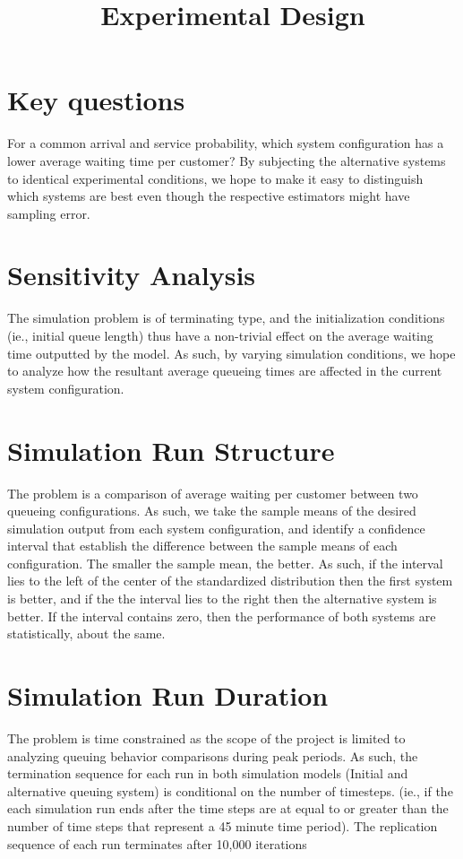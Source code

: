 \documentclass{article}
\begin{document}
\pagecolor{ultramarine}
\title{Experimental Design}
\author{}
\date{}
\maketitle
\section{Key questions}
For a common arrival and service probability, which system configuration has a lower average waiting time per customer? By subjecting the alternative systems to identical experimental conditions, we hope to make it easy to distinguish which systems are best even though the respective estimators might have sampling error.

\section{Sensitivity Analysis}
The simulation problem is of terminating type, and the initialization conditions (ie., initial queue length) thus have a non-trivial effect on the average waiting time outputted by the model. As such, by varying simulation conditions, we hope to analyze how the resultant average queueing times are affected in the current system configuration.

\section{Simulation Run Structure}
The problem is a comparison of average waiting per customer between two queueing configurations. As such, we take the sample means of the desired simulation output from each system configuration, and identify a confidence interval that establish the difference between the sample means of each configuration. The smaller the sample mean, the better. As such, if the interval lies to the left of the center of the standardized distribution then the first system is better, and if the the interval lies to the right then the alternative system is better. If the interval contains zero, then the performance of both systems are statistically, about the same. 

\section{Simulation Run Duration}
The problem is time constrained as the scope of the project is limited to analyzing queuing behavior comparisons during peak periods. As such, the termination sequence for each run in both simulation models (Initial and alternative queuing system) is conditional on the number of timesteps. (ie., if the each simulation run ends after the time steps are at equal to or greater than the number of time steps that represent a 45 minute time period). The replication sequence of each run terminates after 10,000 iterations
\end{document}
